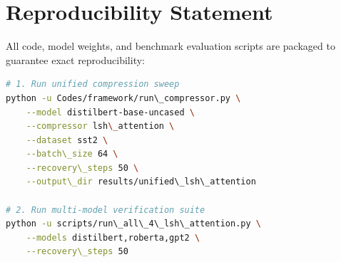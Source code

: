 \section{Reproducibility Statement}
All code, model weights, and benchmark evaluation scripts are packaged to guarantee exact reproducibility:
\begin{lstlisting}[language=bash]
# 1. Run unified compression sweep
python -u Codes/framework/run\_compressor.py \
    --model distilbert-base-uncased \
    --compressor lsh\_attention \
    --dataset sst2 \
    --batch\_size 64 \
    --recovery\_steps 50 \
    --output\_dir results/unified\_lsh\_attention

# 2. Run multi-model verification suite
python -u scripts/run\_all\_4\_lsh\_attention.py \
    --models distilbert,roberta,gpt2 \
    --recovery\_steps 50
\end{lstlisting}
